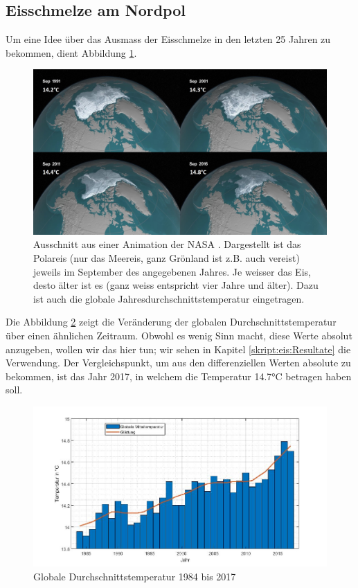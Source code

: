 \begin{refsection}
\subsection{Eisschmelze am Nordpol}
Um eine Idee über das Ausmass der Eisschmelze in den letzten 25 Jahren zu bekommen, dient Abbildung \ref{skript:eis:fig:NASAohne}.
\begin{figure}
	\centering
	\includegraphics[width=14cm]{eis/NASA_ohne_Breitengraden.jpg}
	\caption{Ausschnitt aus einer Animation der NASA \cite{skript:eis:animation_NASA}. Dargestellt ist das Polareis (nur das Meereis, ganz Grönland ist z.B. auch vereist) jeweils im September des angegebenen Jahres. Je weisser das Eis, desto älter ist es (ganz weiss entspricht vier Jahre und älter).	Dazu ist auch die globale Jahresdurchschnittstemperatur eingetragen.}
	\label{skript:eis:fig:NASAohne}
\end{figure}
Die Abbildung \ref{skript:eis:fig:globale_Mitteltemperaturen} zeigt die Veränderung der globalen Durchschnittstemperatur über einen ähnlichen Zeitraum. Obwohl es wenig Sinn macht, diese Werte absolut anzugeben, wollen wir das hier tun; wir sehen in Kapitel \ref{skript:eis:Resultate} die Verwendung. Der Vergleichspunkt, um aus den differenziellen Werten \cite{skript:eis:animation_NASA} absolute zu bekommen, ist das Jahr 2017, in welchem die Temperatur 14.7°C \cite{skript:eis:ref2017} betragen haben soll.
\begin{figure}
	\centering
	\includegraphics[width=14cm]{eis/globale_Mitteltemperaturen.jpg}
	\caption{Globale Durchschnittstemperatur 1984 bis 2017}
	\label{skript:eis:fig:globale_Mitteltemperaturen}
\end{figure}

\end{refsection}
